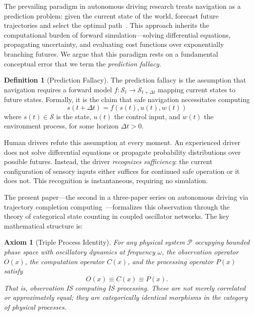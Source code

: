 \documentclass[twocolumn,10pt]{article}
\newtheorem{axiom}[theorem]{Axiom}
\theoremstyle{definition}
\newtheorem{definition}[theorem]{Definition}
\theoremstyle{remark}
\begin{document}
The prevailing paradigm in autonomous driving research treats navigation as a
prediction problem: given the current state of the world, forecast future
trajectories and select the optimal path~\cite{thrun2006,bojarski2016}. This
approach inherits the computational burden of forward simulation---solving
differential equations, propagating uncertainty, and evaluating cost
functions over exponentially branching futures. We argue that this paradigm
rests on a fundamental conceptual error that we term the \emph{prediction fallacy}.

\begin{definition}[Prediction Fallacy]\label{def:prediction-fallacy}
The prediction fallacy is the assumption that navigation requires a forward
model $f: \mathcal{S}_t \to \mathcal{S}_{t+\Delta t}$ mapping current states
to future states. Formally, it is the claim that safe navigation necessitates
computing
\begin{equation}\label{eq:prediction}
  s(t + \Delta t) = f(s(t), u(t), w(t))
\end{equation}
where $s(t) \in \mathcal{S}$ is the state, $u(t)$ the control input, and
$w(t)$ the environment process, for some horizon $\Delta t > 0$.
\end{definition}

Human drivers refute this assumption at every moment. An experienced driver
does not solve differential equations or propagate probability distributions
over possible futures. Instead, the driver \emph{recognizes sufficiency}:
the current configuration of sensory inputs either suffices for continued
safe operation or it does not. This recognition is instantaneous, requiring
no simulation.

The present paper---the second in a three-paper series on autonomous driving
via trajectory completion computing~\cite{sachikonye2026trajectory}---formalizes
this observation through the theory of categorical state counting in coupled
oscillator networks. The key mathematical structure is:

\begin{axiom}[Triple Process Identity]\label{ax:triple-process}
For any physical system $\mathcal{P}$ occupying bounded phase space with
oscillatory dynamics at frequency $\omega$, the observation operator
$O(x)$, the computation operator $C(x)$, and the processing operator
$P(x)$ satisfy
\begin{equation}\label{eq:triple-identity}
  O(x) \equiv C(x) \equiv P(x).
\end{equation}
That is, observation IS computing IS processing. These are not merely
correlated or approximately equal; they are categorically identical morphisms
in the category of physical processes.
\end{axiom}
\end{document}
